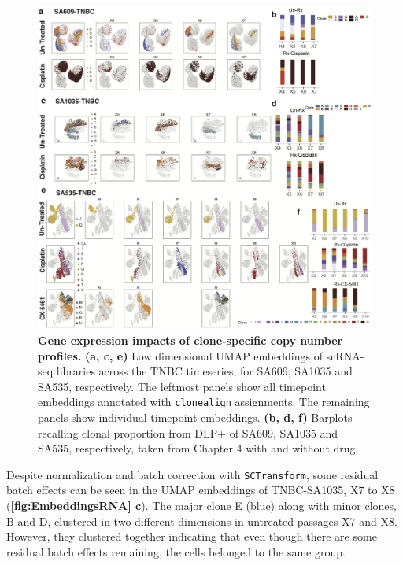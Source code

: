 \begin{figure}
\centering
\includegraphics[width=\textwidth]{Figures/chap5/EmbeddingsRNA.png}
	
\caption[Gene expression impacts of clone-specific copy number profiles]
	{\small
	\textbf{Gene expression impacts of clone-specific copy number profiles.}
	\textbf{(a, c, e)} Low dimensional \ac{UMAP} embeddings of  scRNA-seq libraries across the TNBC timeseries, for SA609, SA1035 and SA535, respectively. The leftmost panels show all timepoint embeddings annotated with \texttt{clonealign} assignments. The remaining panels show individual timepoint embeddings.
	\textbf{(b, d, f)} Barplots recalling clonal proportion from DLP+ of SA609, SA1035 and SA535, respectively, taken from Chapter 4 with and without drug. 
	}
	\label{fig:EmbeddingsRNA}
\end{figure}


Despite normalization and batch correction with \texttt{SCTransform}, some residual batch effects can be seen in the UMAP embeddings of TNBC-SA1035, X7 to X8 (\textbf{\autoref{fig:EmbeddingsRNA} c}). The major clone E (blue) along with minor clones, B and D,  clustered in two different dimensions in untreated passages X7 and X8. However, they clustered together indicating that even though there are some residual batch effects remaining, the cells belonged to the same group.

